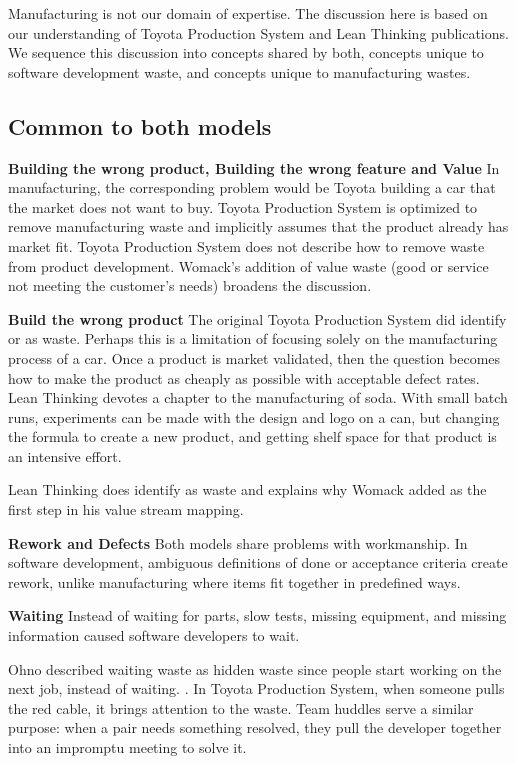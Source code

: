 Manufacturing is not our domain of expertise. The discussion here is based on our understanding of Toyota Production System and Lean Thinking publications. We sequence this discussion into concepts shared by both, concepts unique to software development waste, and concepts unique to manufacturing wastes.

\subsection{Common to both models}

\textbf{Building the wrong product, Building the wrong feature and Value}
In manufacturing, the corresponding problem would be Toyota building a car that the market does not want to buy. Toyota Production System is optimized to remove manufacturing waste and implicitly assumes that the product already has market fit. Toyota Production System does not describe how to remove waste from product development. Womack's addition of value waste (good or service not meeting the customer's needs) broadens the discussion.

\textbf{Build the wrong product}
The original Toyota Production System did identify  or  as waste. Perhaps this is a limitation of focusing solely on the manufacturing process of a car. Once a product is market validated, then the question becomes how to make the product as cheaply as possible with acceptable defect rates. Lean Thinking devotes a chapter to the manufacturing of soda. With small batch runs, experiments can be made with the design and logo on a can, but changing the formula to create a new product, and getting shelf space for that product is an intensive effort. 

Lean Thinking does identify  as waste and explains why Womack added  as the first step in his value stream mapping. 

\textbf{Rework and Defects}
Both models share problems with workmanship.  In software development, ambiguous definitions of done or acceptance criteria create rework, unlike manufacturing where items fit together in predefined ways. 

\textbf{Waiting}
Instead of waiting for parts, slow tests, missing equipment, and missing information caused software developers to wait.

Ohno described waiting waste as hidden waste since people start working on the next job, instead of waiting. \cite{OhnoToyotaProductionSystem}. In Toyota Production System, when someone pulls the red cable, it brings attention to the waste. Team huddles serve a similar purpose: when a pair needs something resolved, they pull the developer together into an impromptu meeting to solve it. 

